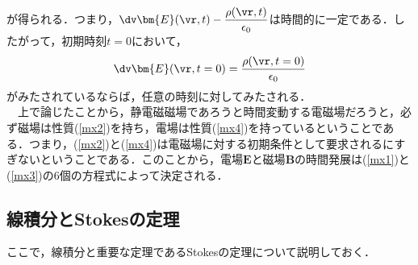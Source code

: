が得られる．つまり，$\dv\bm{E}(\vr,t)-\dfrac{\rho(\vr,t)}{\epsilon_0}$は時間的に一定である．したがって，初期時刻$t=0$において，
\begin{align}\label{g5}
\dv\bm{E}(\vr,t=0)=\frac{\rho(\vr,t=0)}{\epsilon_0}
\end{align}
がみたされているならば，任意の時刻に対してみたされる．\\
　上で論じたことから，静電磁磁場であろうと時間変動する電磁場だろうと，必ず磁場は性質(\ref{mx2})を持ち，電場は性質(\ref{mx4})を持っているということである．つまり，(\ref{mx2})と(\ref{mx4})は電磁場に対する初期条件として要求されるにすぎないということである．このことから，電場$\bm{E}$と磁場$\bm{B}$の時間発展は(\ref{mx1})と(\ref{mx3})の6個の方程式によって決定される．















%
\subsection{線積分とStokesの定理}
ここで，線積分と重要な定理であるStokesの定理について説明しておく．
